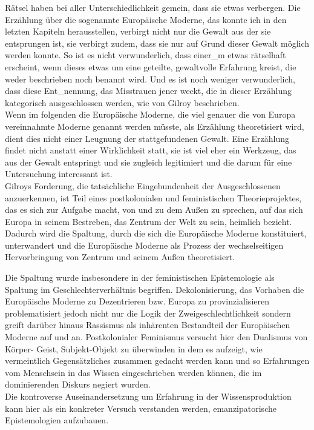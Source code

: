 Rätsel haben bei aller Unterschiedlichkeit gemein, dass sie etwas verbergen.
Die Erzählung über die sogenannte Europäische Moderne, das konnte ich in den
letzten Kapiteln herausstellen, verbirgt nicht nur die Gewalt aus der sie
entsprungen ist, sie verbirgt zudem, dass sie nur auf Grund dieser Gewalt
möglich werden konnte. So ist es nicht verwunderlich, dass einer\_m etwas
rätselhaft erscheint, wenn dieses etwas um eine geteilte, gewaltvolle Erfahrung
kreist, die weder beschrieben noch benannt wird. Und es ist noch weniger
verwunderlich, dass diese Ent\_nennung, das Misstrauen jener weckt, die in
dieser Erzählung kategorisch ausgeschlossen werden, wie von Gilroy beschrieben.\\
Wenn im folgenden die Europäische Moderne, die viel genauer die von Europa
vereinnahmte Moderne genannt werden müsste, als Erzählung theoretisiert wird,
dient dies nicht einer Leugnung der stattgefundenen Gewalt. Eine Erzählung
findet nicht anstatt einer Wirklichkeit statt, sie ist viel eher ein Werkzeug,
das aus der Gewalt entspringt und sie zugleich legitimiert und die darum für
eine Untersuchung interessant ist.\footnotemark {} 
\\

Gilroys Forderung, die tatsächliche Eingebundenheit der Ausgeschlossenen
anzuerkennen, ist Teil eines postkolonialen und feministischen
Theorieprojektes, das es sich zur Aufgabe macht, von und zu dem Außen zu
sprechen, auf das sich Europa in seinem Bestreben, das Zentrum der Welt zu
sein, heimlich bezieht. \\
Dadurch wird die Spaltung, durch die sich die
Europäische Moderne konstituiert, unterwandert und die Europäische Moderne als
Prozess der wechselseitigen Hervorbringung von Zentrum und seinem Außen
theoretisiert. 

Die Spaltung wurde insbesondere in der feministischen
Epistemologie als Spaltung im Geschlechterverhältnis begriffen.
Dekolonisierung, das Vorhaben die  Europäische Moderne zu Dezentrieren bzw.
Europa zu \glqq provinzialisieren \grqq\footnotemark
{} problematisiert jedoch nicht nur die Logik der
Zweigeschlechtlichkeit sondern greift darüber hinaus Rassismus als inhärenten
Bestandteil der Europäischen Moderne auf und an. Postkolonialer Feminismus
versucht hier den Dualismus von Körper- Geist, Subjekt-Objekt zu überwinden in
dem es aufzeigt, wie vermeintlich Gegensätzliches zusammen gedacht werden kann
und so Erfahrungen vom Menschsein in das Wissen eingeschrieben werden können,
die im dominierenden Diskurs negiert wurden. \\
Die kontroverse Auseinandersetzung
um Erfahrung in der Wissensproduktion kann hier als ein konkreter Versuch
verstanden werden, emanzipatorische Epistemologien aufzubauen.
\\


